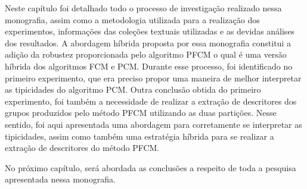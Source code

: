Neste capítulo foi detalhado todo o processo de investigação realizado nessa monografia, assim como
a metodologia utilizada para a realização dos experimentos, informações das coleções textuais
utilizadas e as devidas análises dos resultados. A abordagem híbrida proposta por essa monografia
constitui a adição da robustez proporcionada pelo algoritmo PFCM o qual é uma versão híbrida dos
algoritmos FCM e PCM. Durante esse processo, foi identificado no primeiro experimento, que era
preciso propor uma maneira de melhor interpretar as tipicidades do algoritmo PCM. Outra conclusão
obtida do primeiro experimento, foi também a necessidade de realizar a extração de descritores dos
grupos produzidos pelo método PFCM utilizando as duas partições. Nesse sentido, foi aqui
apresentada uma abordagem para corretamente se interpretar as tipicidades, assim como também uma
estratégia híbrida para se realizar a extração de descritores do método PFCM.

No próximo capítulo, será abordada as conclusões a respeito de toda a pesquisa apresentada nessa
monografia.


